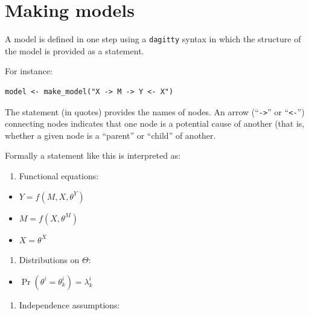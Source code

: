 \documentclass[
  article]{jss}
\providecommand{\tightlist}{%
  \setlength{\itemsep}{0pt}\setlength{\parskip}{0pt}}\usepackage{longtable,booktabs,array}
\begin{document}
\hypertarget{sec-models}{%
\section{Making models}\label{sec-models}}

A model is defined in one step using a \texttt{dagitty} syntax in which
the structure of the model is provided as a statement.

For instance:

\begin{verbatim}
model <- make_model("X -> M -> Y <- X")
\end{verbatim}

The statement (in quotes) provides the names of nodes. An arrow
(``\texttt{-\textgreater{}}'' or ``\texttt{\textless{}-}'') connecting
nodes indicates that one node is a potential cause of another (that is,
whether a given node is a ``parent'' or ``child'' of another.

Formally a statement like this is interpreted as:

\begin{enumerate}
\def\labelenumi{\arabic{enumi}.}
\tightlist
\item
  Functional equations:
\end{enumerate}

\begin{itemize}
\tightlist
\item
  \(Y = f(M, X, \theta^Y)\)
\item
  \(M = f(X, \theta^M)\)
\item
  \(X = \theta^X\)
\end{itemize}

\begin{enumerate}
\def\labelenumi{\arabic{enumi}.}
\setcounter{enumi}{1}
\tightlist
\item
  Distributions on \(\Theta\):
\end{enumerate}

\begin{itemize}
\tightlist
\item
  \(\Pr(\theta^i = \theta^i_k) = \lambda^i_k\)
\end{itemize}

\begin{enumerate}
\def\labelenumi{\arabic{enumi}.}
\setcounter{enumi}{2}
\tightlist
\item
  Independence assumptions:\\
\end{enumerate}
\end{document}
